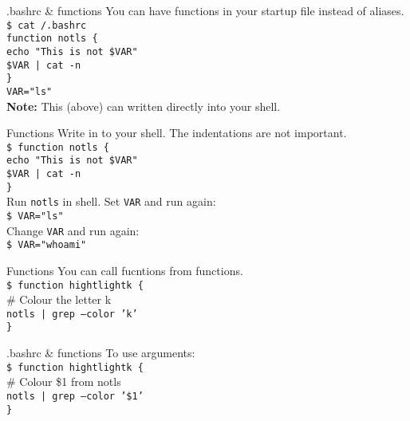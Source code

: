 \documentclass{beamer}
\let\tt\texttt
\let\bf\textbf
\let\tilde\texttildelow
\begin{document}
\begin{frame}{.bashrc \& functions}
        You can have functions in your startup file instead of aliases. \\
        \tt{\$ cat {\tilde}/.bashrc}    \\
        \tt{function notls \{ }         \\
        \quad \tt{echo "This is not \$VAR"} \\
        \quad \tt{\$VAR | cat -n }      \\
        \tt{\} }                        \\
        \tt{VAR="ls"}                   \\
        \bf{Note:} This (above) can written directly into your shell. \\
\end{frame}

\begin{frame}{Functions}
        Write in to your shell. The indentations are not important. \\
        \tt{\$ function notls \{ }         \\
        \quad \tt{echo "This is not \$VAR"} \\
        \quad \tt{\$VAR | cat -n }      \\
        \tt{\} }                        \\
        Run \tt{notls} in shell. Set \tt{VAR} and run again: \\
        \tt{\$ VAR="ls"}                   \\
        Change \tt{VAR} and run again:     \\
        \tt{\$ VAR="whoami"}               \\
\end{frame}

\begin{frame}{Functions}
        You can call fucntions from functions.  \\
        \tt{\$ function hightlightk \{ }        \\
        \quad \# Colour the letter k            \\
        \quad \tt{notls | grep --color 'k'}     \\
        \tt{\} }                        \\
\end{frame}

\begin{frame}{.bashrc \& functions}
        To use arguments:                       \\
        \tt{\$ function hightlightk \{ }        \\
        \quad \# Colour \$1 from notls          \\
        \quad \tt{notls | grep --color '\$1' }  \\
        \tt{\} }                                \\
\end{frame}
\end{document}
